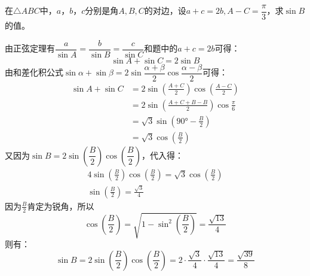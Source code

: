 \documentclass[answers]{exam}
\begin{document}
\begin{questions}
\begin{solution}
\begin{enumerate}[label=\protect\circled{\arabic*}]
			      \begin{center}
			      \end{center}

		\end{enumerate}
	\end{solution}
	\question 在$\triangle{ABC}$中，$a$，$b$，$c$分别是角$A,B,C$的对边，设$a+c=2b,
		A-C=\dfrac{\pi}{3}$，求$\sin{B}$的值。

	\begin{solution}
		由正弦定理有$\dfrac{a}{\sin{A}}=\dfrac{b}{\sin{B}}=\dfrac{c}{\sin{C}}$和题中的$a+c=2b$可得：
		\begin{equation*}
			\sin{A} + \sin{C} = 2\sin{B}
		\end{equation*}
		由和差化积公式$\sin\alpha + \sin\beta = 2\sin{\dfrac{\alpha+\beta}{2}}\cos{\dfrac{\alpha-\beta}{2}}$可得：
		\begin{align*}
			\sin{A} + \sin{C} & = 2\sin \left( \frac{A+C}{2} \right)\cos \left( \frac{A-C}{2} \right) \\
			                  & = 2\sin \left( \frac{A+C+B - B}{2} \right) \cos{\frac{\pi}{6}}        \\
			                  & = \sqrt{3}\sin(\ang{90}-\frac{B}{2})                                  \\
			                  & = \sqrt{3}\cos\left(\frac{B}{2}\right)
		\end{align*}
		又因为$\sin{B}=2\sin\left(\dfrac{B}{2}\right)\cos\left(\dfrac{B}{2}\right)$，代入得：
		\begin{align*}
			4\sin\left(\frac{B}{2}\right)\cos\left(\frac{B}{2}\right) = \sqrt{3}\cos\left(\frac{B}{2}\right) \\
			\sin\left(\frac{B}{2}\right) = \frac{\sqrt{3}}{4}
		\end{align*}
		因为$\frac{B}{2}$肯定为锐角，所以
		\begin{equation*}
			\cos\left(\frac{B}{2}\right) = \sqrt{1 - \sin^2 \left(\frac{B}{2}\right)}= \frac{\sqrt{13}}{4}
		\end{equation*}
		则有：
		\begin{equation*}
			\sin{B} = 2\sin{\left( \frac{B}{2} \right)} \cos{\left( \frac{B}{2}
				\right)}=2\cdot\frac{\sqrt{3}}{4}\cdot\frac{\sqrt{13}}{4} = \frac{\sqrt{39}}{8}
		\end{equation*}
	\end{solution}
\end{questions}
\end{document}

